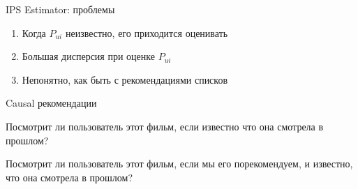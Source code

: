 \documentclass[11pt,aspectratio=169]{beamer}
\begin{document}
\begin{frame}{IPS Estimator: проблемы}

\begin{enumerate}
\item Когда $P_{ui}$ неизвестно, его приходится оценивать
\item Большая дисперсия при оценке $P_{ui}$
\item Непонятно, как быть с рекомендациями списков
\end{enumerate}

\end{frame}

\begin{frame}{Causal рекомендации}

\begin{tcolorbox}[colback=warn!5,colframe=warn!80,title=Традиционный рекомендер]
Посмотрит ли пользователь этот фильм, если известно что она смотрела в прошлом?
\end{tcolorbox}

\begin{tcolorbox}[colback=info!5,colframe=info!80,title=Causal рекомендер]
Посмотрит ли пользователь этот фильм, если мы его порекомендуем, и известно, что она смотрела в прошлом?
\end{tcolorbox}

\end{frame}
\end{document}
